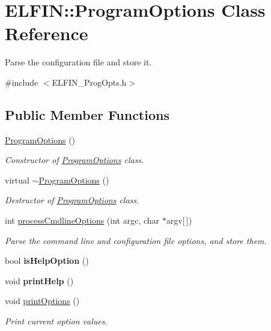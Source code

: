 \hypertarget{class_e_l_f_i_n_1_1_program_options}{\section{E\-L\-F\-I\-N\-:\-:Program\-Options Class Reference}
\label{class_e_l_f_i_n_1_1_program_options}
}


Parse the configuration file and store it.  




{\ttfamily \#include $<$E\-L\-F\-I\-N\-\_\-\-Prog\-Opts.\-h$>$}

\subsection*{Public Member Functions}
\begin{DoxyCompactItemize}
\item 
\hyperlink{class_e_l_f_i_n_1_1_program_options_ae9c76cc6526e9e5e9a86406cbf7557ae}{Program\-Options} ()
\begin{DoxyCompactList}\small\item\em Constructor of \hyperlink{class_e_l_f_i_n_1_1_program_options}{Program\-Options} class. \end{DoxyCompactList}\item 
virtual \hyperlink{class_e_l_f_i_n_1_1_program_options_a49087de0dba7f30558b339711e25b244}{$\sim$\-Program\-Options} ()
\begin{DoxyCompactList}\small\item\em Destructor of \hyperlink{class_e_l_f_i_n_1_1_program_options}{Program\-Options} class. \end{DoxyCompactList}\item 
int \hyperlink{class_e_l_f_i_n_1_1_program_options_a0597be1826180e777bcf3aa5ee5192a2}{process\-Cmdline\-Options} (int argc, char $\ast$argv\mbox{[}$\,$\mbox{]})
\begin{DoxyCompactList}\small\item\em Parse the command line and configuration file options, and store them. \end{DoxyCompactList}\item 
\hypertarget{class_e_l_f_i_n_1_1_program_options_afef36c153116f9e303c32393d2f3b9a5}{bool {\bfseries is\-Help\-Option} ()}\label{class_e_l_f_i_n_1_1_program_options_afef36c153116f9e303c32393d2f3b9a5}

\item 
\hypertarget{class_e_l_f_i_n_1_1_program_options_a872d4fcf3d92230f5195095faf6794c4}{void {\bfseries print\-Help} ()}\label{class_e_l_f_i_n_1_1_program_options_a872d4fcf3d92230f5195095faf6794c4}

\item 
void \hyperlink{class_e_l_f_i_n_1_1_program_options_ab7ab803dd5e6e0b1ffa650da4be82dee}{print\-Options} ()
\begin{DoxyCompactList}\small\item\em Print current option values. \end{DoxyCompactList}\end{DoxyCompactItemize}
